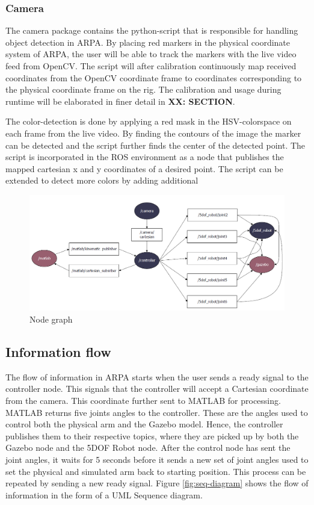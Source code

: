 \documentclass[11pt,a4paper, titlepage]{report}
\begin{document}
\subsubsection{Camera}
The camera package contains the python-script that is responsible for handling object detection in ARPA. By placing red markers in the physical coordinate system of ARPA, the user will be able to track the markers with the live video feed from OpenCV. The script will after calibration continuously map received coordinates from the OpenCV coordinate frame to coordinates corresponding to the physical coordinate frame on the rig. The calibration and usage during runtime will be elaborated in finer detail in \textbf{XX: SECTION}.

The color-detection is done by applying a red mask in the HSV-colorspace on each frame from the live video. By finding the contours of the image the marker can be detected and the script further finds the center of the detected point. The script is incorporated in the ROS environment as a node that publishes the mapped cartesian x and y coordinates of a desired point. The script can be extended to detect more colors by adding additional
	
	\begin{figure}[H]
		\includegraphics[width=\linewidth]{../Diagrams/NodeGraph-v1.png}
		\caption{Node graph}
		\label{fig:nodegraph}
	\end{figure}
	
	
	
	\subsection{Information flow}
	
	The flow of information in ARPA starts when the user sends a ready signal to the controller node. This signals that the controller will accept a Cartesian coordinate from the camera. This coordinate  further sent to MATLAB for processing. MATLAB returns five joints angles to the controller. These are the angles used to control both the physical arm and the Gazebo model. Hence, the controller publishes them to their respective topics, where they are picked up by both the Gazebo node and the 5DOF Robot node. After the control node has sent the joint angles, it waits for 5 seconds before it sends a new set of joint angles used to set the physical and simulated arm back to starting position. This process can be repeated by sending a new ready signal. Figure \ref{fig:seq-diagram} shows the flow of information in the form of a UML Sequence diagram.
	
\end{document}
